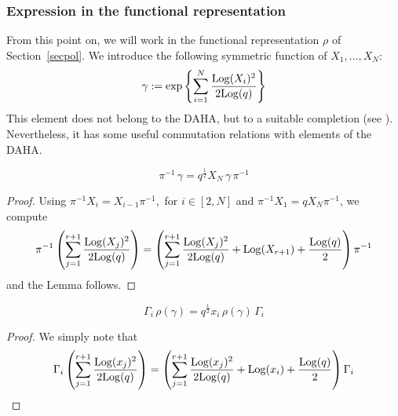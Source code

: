 \subsubsection{Expression in the functional representation}

From this point on, we will work in the functional representation $\rho$ of Section~\ref{secpol}.
We introduce the following symmetric function of $X_1,...,X_{N}$:
\begin{equation}\label{gammadefn}
\gamma:=\exp\left\{ \sum_{i=1}^{N} \frac{{\rm Log}(X_i)^2}{2 {\rm Log}(q)}\right\} 
\end{equation}
This element does not belong to the DAHA, but to a suitable completion (see \cite{Cheredbook}). Nevertheless, it has some useful commutation relations with elements of the DAHA.

\begin{lemma}\label{piga}
$$\pi^{-1} \, \gamma=q^{\frac{1}{2}}X_{N} \,  \gamma \, \pi^{-1} $$
\end{lemma}
\begin{proof}
Using $\pi^{-1}X_i=X_{i-1}\pi^{-1},$ for $i\in[2,N]$ and $\pi^{-1}X_1=q X_{N}\pi^{-1}$,
we compute
$$\pi^{-1} \left(\sum_{j=1}^{r+1} \frac{{\rm Log}(X_j)^2}{2 {\rm Log}(q)}\right)=
\left(\sum_{j=1}^{r+1} \frac{{\rm Log}(X_j)^2}{2 {\rm Log}(q)}+{\rm Log}(X_{r+1})+\frac{{\rm Log}(q)}{2}\right)\pi^{-1}$$
and the Lemma follows.
\end{proof}


\begin{lemma}\label{gaga}
$$\Gamma_i \, \rho(\gamma)=q^{\frac{1}{2}}x_i \,  \rho(\gamma) \, \Gamma_i $$
\end{lemma}
\begin{proof}
We simply note that 
$$\Gamma_i \left(\sum_{j=1}^{r+1} \frac{{\rm Log}(x_j)^2}{2 {\rm Log}(q)}\right)=
\left(\sum_{j=1}^{r+1} \frac{{\rm Log}(x_j)^2}{2 {\rm Log}(q)}+{\rm Log}(x_i)+\frac{{\rm Log}(q)}{2}\right)\Gamma_i$$
\end{proof}

